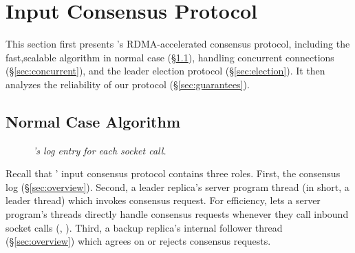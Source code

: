 \section{Input Consensus Protocol} \label{sec:input}

This section first presents \xxx's RDMA-accelerated \paxos consensus protocol, 
including the fast,scalable algorithm in normal case (\S\ref{sec:normal}), 
handling concurrent connections (\S\ref{sec:concurrent}), and the leader 
election protocol (\S\ref{sec:election}). It then analyzes the reliability of 
our protocol (\S\ref{sec:guarantees}).

\subsection{Normal Case Algorithm} \label{sec:normal}

\begin{figure}[t]
\centering
\begin{minipage}{.5\textwidth}
\end{minipage}
\vspace{-.1in}
\caption{{\em \xxx's log entry for each socket call.}} \label{fig:logentry}
\vspace{-.05in}
\end{figure}



Recall that \xxx' input consensus protocol contains three roles. First, the 
\paxos consensus log (\S\ref{sec:overview}). Second, a leader replica's server 
program thread (in short, a leader thread) which invokes consensus request. For 
efficiency, \xxx lets a server program's threads directly handle consensus 
requests whenever they call inbound socket calls (\eg, \recv). Third, a backup 
replica's \xxx internal follower thread (\S\ref{sec:overview}) which agrees on 
or rejects consensus requests.

